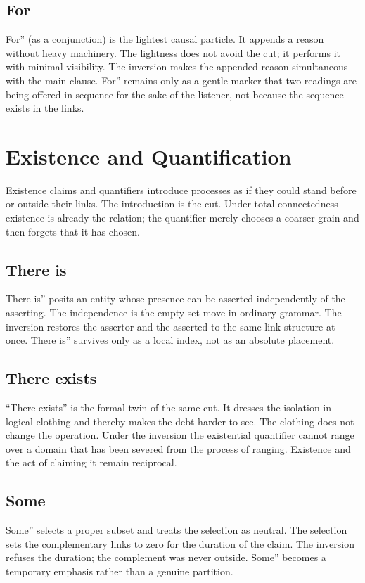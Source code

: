 \documentclass[11pt,a4paper]{article}
\begin{document}
\subsection{For} For'' (as a conjunction) is the lightest causal particle. It appends a reason without heavy machinery. The lightness does not avoid the cut; it performs it with minimal visibility. The inversion makes the appended reason simultaneous with the main clause. For'' remains only as a gentle marker that two readings are being offered in sequence for the sake of the listener, not because the sequence exists in the links.

\section{Existence and Quantification}

Existence claims and quantifiers introduce processes as if they could stand before or outside their links. The introduction is the cut. Under total connectedness existence is already the relation; the quantifier merely chooses a coarser grain and then forgets that it has chosen.

\subsection{There is} There is'' posits an entity whose presence can be asserted independently of the asserting. The independence is the empty-set move in ordinary grammar. The inversion restores the assertor and the asserted to the same link structure at once. There is'' survives only as a local index, not as an absolute placement.

\subsection{There exists} ``There exists'' is the formal twin of the same cut. It dresses the isolation in logical clothing and thereby makes the debt harder to see. The clothing does not change the operation. Under the inversion the existential quantifier cannot range over a domain that has been severed from the process of ranging. Existence and the act of claiming it remain reciprocal.

\subsection{Some} Some'' selects a proper subset and treats the selection as neutral. The selection sets the complementary links to zero for the duration of the claim. The inversion refuses the duration; the complement was never outside. Some'' becomes a temporary emphasis rather than a genuine partition.
\end{document}
